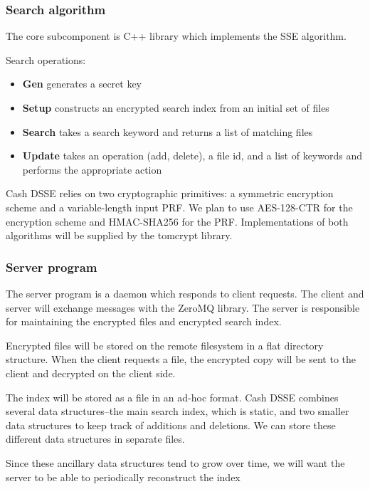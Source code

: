 \documentclass[onecolumn, draftclsnofoot,10pt, compsoc]{IEEEtran}
\begin{document}
\subsubsection{ Search algorithm }

The core subcomponent is C++ library which implements the SSE algorithm.

Search operations:
\begin{itemize}
\item \textbf{Gen} generates a secret key
\item \textbf{Setup} constructs an encrypted search index from an initial set of files
\item \textbf{Search} takes a search keyword and returns a list of matching files
\item \textbf{Update} takes an operation (add, delete), a file id, and a list of keywords and performs the appropriate action
\end{itemize}

Cash DSSE relies on two cryptographic primitives: a symmetric encryption scheme and a variable-length input PRF. We plan to use AES-128-CTR for the encryption scheme and HMAC-SHA256 for the PRF. Implementations of both algorithms will be supplied by the tomcrypt \cite{tomcrypt} library.

\subsubsection{ Server program }

The server program is a daemon which responds to client requests.
The client and server will exchange messages with the ZeroMQ library.
The server is responsible for maintaining the encrypted files and encrypted search index.

Encrypted files will be stored on the remote filesystem in a flat directory structure. When the client requests a file, the encrypted copy will be sent to the client and decrypted on the client side.

The index will be stored as a file in an ad-hoc format. Cash DSSE combines several data structures--the main search index, which is static, and two smaller data structures to keep track of additions and deletions. We can store these different data structures in separate files. %

Since these ancillary data structures tend to grow over time, we will want the server to be able to periodically reconstruct the index
\end{document}
